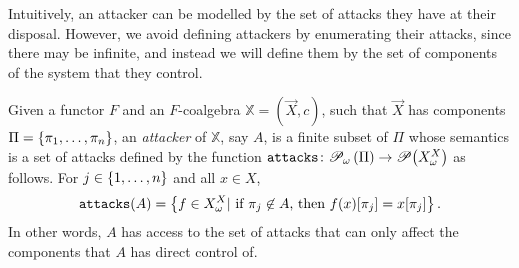 Intuitively, an attacker can be modelled by the set of attacks they have at their disposal. However, we avoid defining attackers by enumerating their attacks, since there may be infinite, and instead we will define them by the set of components of the system that they control. 

\begin{definition}[Attacker]
Given a functor $F$ and an $F$-coalgebra $\mathbb{X}=(\vec{X},c)$, such that $\vec{X}$ has components $\Pi=\left\{\pi_1, \ldots, \pi_n\right\}$, an \emph{attacker} of $\mathbb{X}$, say $A$, is a {finite} subset of $\Pi$ whose semantics is a set of attacks defined by the function $\texttt{attacks}\colon {{{\mathscr{P}}_\omega}\left(\Pi\right)}\rightarrow{{\mathscr{P}}\!\left({X^X_\omega}\right)}$ as follows. 
For $j\in \left\{1, \ldots,  n\right\}$ and all $x\in X$,
\begin{align}
\texttt{attacks}(A)=\left\{f\in X^X_\omega | \text{ if $\pi_j \not\in A$, then $f(x)[\pi_j]=x[\pi_j]$}\right\}.
\end{align}
In other words, $A$ has access to the set of attacks that can only affect the components that $A$ has direct control of.
 \end{definition}
% 
%
